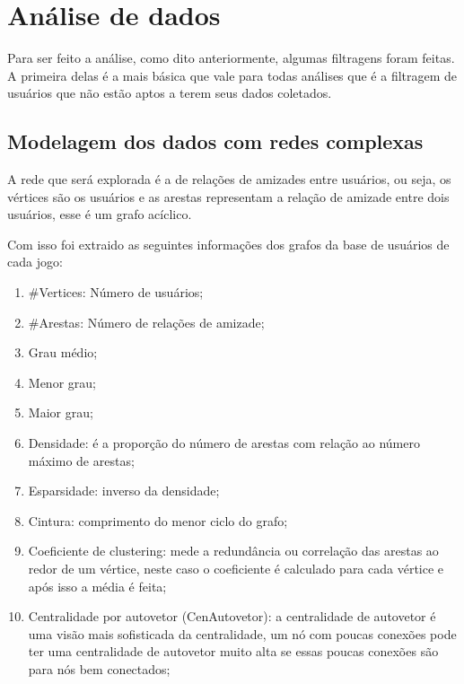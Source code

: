 \documentclass[12pt]{article}
\begin{document}
\section{Análise de dados}

Para ser feito a análise, como dito anteriormente, algumas filtragens foram feitas. A primeira delas é a mais básica que vale para todas análises que é a filtragem de usuários que não estão aptos a terem seus dados coletados.

\subsection{Modelagem dos dados com redes complexas}

A rede que será explorada é a de relações de amizades entre usuários, ou seja, os vértices são os usuários e as arestas representam a relação de amizade entre dois usuários, esse é um grafo acíclico. 

Com isso foi extraido as seguintes informações dos grafos da base de usuários de cada jogo:

\begin{enumerate}
				\item \#Vertices: Número de usuários;
				\item \#Arestas: Número de relações de amizade;
				\item Grau médio;
				\item Menor grau;
				\item Maior grau;
				\item Densidade: é a proporção do número de arestas com relação ao número máximo de arestas;
				\item Esparsidade: inverso da densidade;
				\item Cintura: comprimento do menor ciclo do grafo;
				\item Coeficiente de clustering: mede a redundância ou correlação das arestas ao redor de um vértice, neste caso o coeficiente é calculado para cada vértice e após isso a média é feita;
				\item Centralidade por autovetor (CenAutovetor): a centralidade de autovetor é uma visão mais sofisticada da centralidade, um nó com poucas conexões pode ter uma centralidade de autovetor muito alta se essas poucas conexões são para nós bem conectados;  
\end{enumerate}
\end{document}
